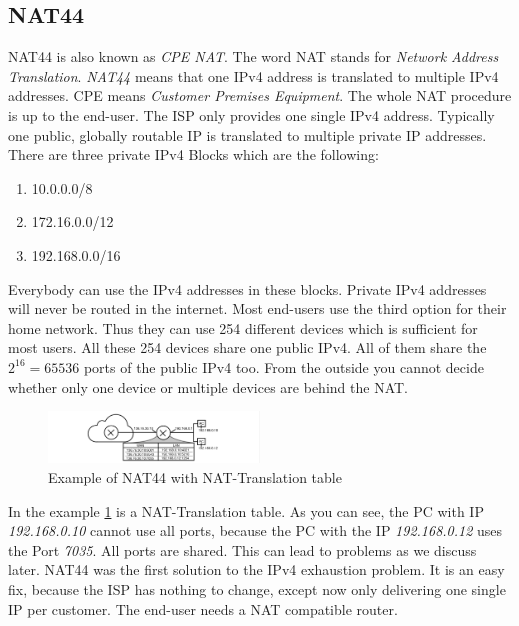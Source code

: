 \documentclass[format=sigconf, natbib=true, nonacm=true]{acmart}
\begin{document}
    \subsection{NAT44}
    NAT44 is also known as \textit{CPE NAT}. The word NAT stands for \textit{Network Address Translation}. \textit{NAT44} means that one IPv4 address is translated to multiple IPv4 addresses. CPE means \textit{Customer Premises Equipment}. The whole NAT procedure is up to the end-user. The ISP only provides one single IPv4 address. Typically one public, globally routable IP is translated to multiple private IP addresses. There are three private IPv4 Blocks which are the following:
    \begin{enumerate}
        \item 10.0.0.0/8
        \item 172.16.0.0/12
        \item 192.168.0.0/16
    \end{enumerate}
    Everybody can use the IPv4 addresses in these blocks. Private IPv4 addresses will never be routed in the internet. Most end-users use the third option for their home network. Thus they can use 254 different devices which is sufficient for most users. All these 254 devices share one public IPv4. All of them share the $2^{16} = 65536$ ports of the public IPv4 too. From the outside you cannot decide whether only one device or multiple devices are behind the NAT.
    \begin{figure}
        \centering
        \includegraphics[width=0.5\textwidth]{images/nat_44.png}
        \caption{Example of NAT44 with NAT-Translation table}
        \label{fig:nat_44}
    \end{figure}
    In the example \ref{fig:nat_44} is a NAT-Translation table. As you can see, the PC with IP \textit{192.168.0.10} cannot use all ports, because the PC with the IP \textit{192.168.0.12} uses the Port \textit{7035}. All ports are shared. This can lead to problems as we discuss later. NAT44 was the first solution to the IPv4 exhaustion problem. It is an easy fix, because the ISP has nothing to change, except now only delivering one single IP per customer. The end-user needs a NAT compatible router.
\end{document}
